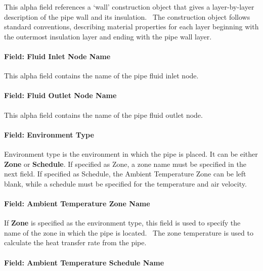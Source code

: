 This alpha field references a `wall' construction object that gives a layer-by-layer description of the pipe wall and its insulation.~ The construction object follows standard conventions, describing material properties for each layer beginning with the outermost insulation layer and ending with the pipe wall layer.

\paragraph{Field: Fluid Inlet Node Name}\label{field-fluid-inlet-node-name-000}

This alpha field contains the name of the pipe fluid inlet node.

\paragraph{Field: Fluid Outlet Node Name}\label{field-fluid-outlet-node-name-000}

This alpha field contains the name of the pipe fluid outlet node.

\paragraph{Field: Environment Type}\label{field-environment-type}

Environment type is the environment in which the pipe is placed. It can be either \textbf{Zone} or \textbf{Schedule}. If specified as Zone, a zone name must be specified in the next field. If specified as Schedule, the Ambient Temperature Zone can be left blank, while a schedule must be specified for the temperature and air velocity.

\paragraph{Field: Ambient Temperature Zone Name}\label{field-ambient-temperature-zone-name}

If \textbf{Zone} is specified as the environment type, this field is used to specify the name of the zone in which the pipe is located.~ The zone temperature is used to calculate the heat transfer rate from the pipe.

\paragraph{Field: Ambient Temperature Schedule Name}\label{field-ambient-temperature-schedule-name}

